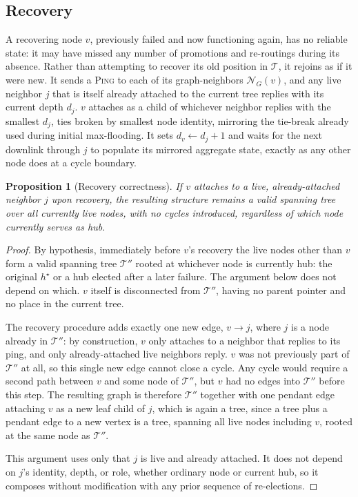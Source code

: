 \documentclass[letterpaper]{article} %
\newtheorem{proposition}{Proposition}
\begin{document}
\subsection{Recovery}

A recovering node $v$, previously failed and now functioning again, has no
reliable state: it may have missed any number of promotions and
re-routings during its absence. Rather than attempting to recover its old
position in $\mathcal{T}$, it rejoins as if it were new. It sends a
\textsc{Ping} to each of its graph-neighbors $\mathcal{N}_G(v)$, and any
live neighbor $j$ that is itself already attached to the current tree
replies with its current depth $d_j$. $v$ attaches as a child of whichever
neighbor replies with the smallest $d_j$, ties broken by smallest node
identity, mirroring the tie-break already used during initial
max-flooding. It sets $d_v \leftarrow d_j+1$ and waits for the next
downlink through $j$ to populate its mirrored aggregate state, exactly as
any other node does at a cycle boundary.

\begin{proposition}[Recovery correctness]
\label{prop:recovery-correct}
If $v$ attaches to a live, already-attached neighbor $j$ upon recovery, the resulting structure remains a valid spanning tree over all currently live nodes, with no cycles introduced, regardless of which node currently serves as hub.
\end{proposition}

\begin{proof}
By hypothesis, immediately before $v$'s recovery the live nodes other than
$v$ form a valid spanning tree $\mathcal{T}''$ rooted at whichever node is
currently hub: the original $h^\star$ or a hub elected after a later failure.
The argument below does not depend on which. $v$ itself is disconnected from
$\mathcal{T}''$, having no parent pointer and no place in the current
tree.

The recovery procedure adds exactly one new edge, $v \to j$, where $j$ is
a node already in $\mathcal{T}''$: by construction, $v$ only attaches to a
neighbor that replies to its ping, and only already-attached live
neighbors reply. $v$ was not previously part of $\mathcal{T}''$ at all, so
this single new edge cannot close a cycle. Any cycle would require a
second path between $v$ and some node of $\mathcal{T}''$, but $v$ had no
edges into $\mathcal{T}''$ before this step. The resulting graph is
therefore $\mathcal{T}''$ together with one pendant edge attaching $v$ as
a new leaf child of $j$, which is again a tree, since a tree plus a
pendant edge to a new vertex is a tree, spanning all live nodes including
$v$, rooted at the same node as $\mathcal{T}''$.

This argument uses only that $j$ is live and already attached. It does not
depend on $j$'s identity, depth, or role, whether ordinary node or current
hub, so it composes without modification with any prior sequence of
re-elections.
\end{proof}
\end{document}
